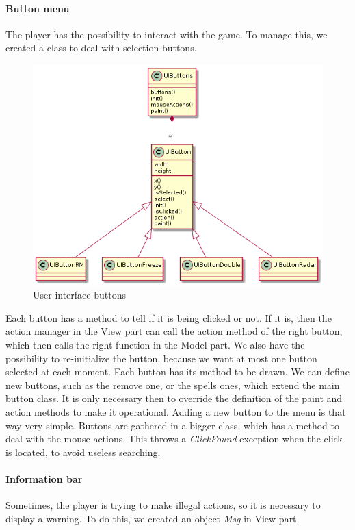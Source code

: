 \documentclass[
	a4paper
]{article}
\begin{document}
\paragraph{Button menu} The player has the possibility to interact with the game. %
To manage this, we created a class to deal with selection buttons.

%
\begin{figure}[H]
	\includegraphics[scale=0.6]{buttonDiagram.png}
	\caption{User interface buttons}
	\label{buttonsDiagram}
\end{figure}
%

Each button has a method to tell if it is being clicked or not. %
If it is, then the action manager in the View part can call the action method of the right button, which then calls the right function in the Model part. %
We also have the possibility to re-initialize the button, because we want at most one button selected at each moment. %
Each button has its method to be drawn. %
We can define new buttons, such as the remove one, or the spells ones, which extend the main button class. %
It is only necessary then to override the definition of the paint and action methods to make it operational. %
Adding a new button to the menu is that way very simple. %
Buttons are gathered in a bigger class, which has a method to deal with the mouse actions. %
This throws a \emph{ClickFound} exception when the click is located, to avoid useless searching.


\paragraph{Information bar} Sometimes, the player is trying to make illegal actions, so it is necessary to display a warning. %
To do this, we created an object \emph{Msg} in View part.
\end{document}
